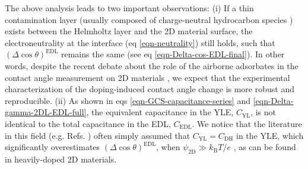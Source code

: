 The above analysis leads to two important observations: (i) If a thin
contamination layer (usually composed of charge-neutral hydrocarbon
species \cite{li_effect_2013}) exists between the Helmholtz layer and
the 2D material surface, the electroneutrality at the interface (eq
\ref{eqn-neutrality}) still holds, such that \((\Delta \cos
\theta)^{\mathrm{EDL}}\) remains the same (see eq
\ref{eqn-Delta-cos-EDL-final}). In other words, despite the recent
debate about the role of the airborne adsorbates in the contact angle
measurement on 2D materials
\cite{li_effect_2013,Kozbial_2015,Xu_2013_withwhat,Chow_2015}, we expect
that the experimental characterization of the doping-induced contact
angle change is more robust and reproducible. (ii) As shown in eqs
\ref{eqn-GCS-capacitance-series} and \ref{eqn-Delta-gamma-2DL-EDL-full},
the equivalent capacitance in the YLE, \(C_{\mathrm{YL}}\), is not
identical to the total capacitance in the EDL, \(C_{\mathrm{EDL}}\). We
notice that the literature in this field (e.g. Refs.
\cite{ostrowski_tunable_2014,daub_electrowetting_2007,goniszewski_correlation_2016,ashraf_doping-induced_2016})
often simply assumed that \(C_{\mathrm{YL}}=C_{\mathrm{DH}}\) in the
YLE, which significantly overestimates \((\Delta \cos
\theta)^{\mathrm{EDL}}\), when \(\psi_{\mathrm{2D}} \gg
k_{\mathrm{B}}T/e\) \cite{israelachvili03_inter}, as can be found in heavily-doped 2D materials. 

